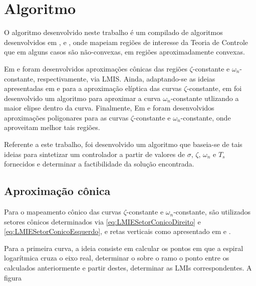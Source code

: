\chapter{Algoritmo}

O algoritmo desenvolvido neste trabalho é um compilado de algoritmos desenvolvidos em \cite{WISNIEWSKI2017}, \cite{WISNIEWSKI2019} e \cite{CHIQUETO2021}, onde mapeiam regiões de interesse da Teoria de Controle que em alguns casos são não-convexas, em regiões aproximadamente convexas.

Em \cite{WISNIEWSKI2017} e \cite{CHIQUETO2021} foram desenvolvidos aproximações cônicas das regiões $\zeta$-constante e $\omega_n$-constante, respectivamente, via LMIS. Ainda, adaptando-se as ideias apresentadas em \cite{ROSINOVA2014} e \cite{ROSINOVA2019} para a aproximação elíptica das curvas $\zeta$-constante, em \cite{CHIQUETO2021} foi desenvolvido um algoritmo para aproximar a curva $\omega_n$-constante utlizando a maior elipse dentro da curva. Finalmente, Em \cite{WISNIEWSKI2019} e \cite{CHIQUETO2021} foram desenvolvidos aproximações poligonares para as curvas $\zeta$-constante e $\omega_n$-constante, onde aproveitam melhor tais regiões.

Referente a este trabalho, foi desenvolvido um algoritmo que baseia-se de tais ideias para sintetizar um controlador a partir de valores de $\sigma$, $\zeta$, $\omega_n$ e $T_s$ fornecidos e determinar a factibilidade da solução encontrada.

\section{Aproximação cônica}

Para o mapeamento cônico das curvas $\zeta$-constante e $\omega_n$-constante, são utilizados setores cônicos determinados via \eqref{eq:LMIESetorConicoDireito} e \eqref{eq:LMIESetorConicoEsquerdo}, e retas verticais como apresentado em \cite{WISNIEWSKI2017} e \cite{CHIQUETO2021}.

Para a primeira curva, a ideia consiste em calcular os pontos em que a espiral logarítmica cruza o eixo real, determinar o sobre o ramo o ponto entre os calculados anteriormente e partir destes, determinar as LMIs correspondentes. A figura

\begin{figure}
  \centering
  
\end{figure}

\begin{figure}
  \centering
  
\end{figure}

